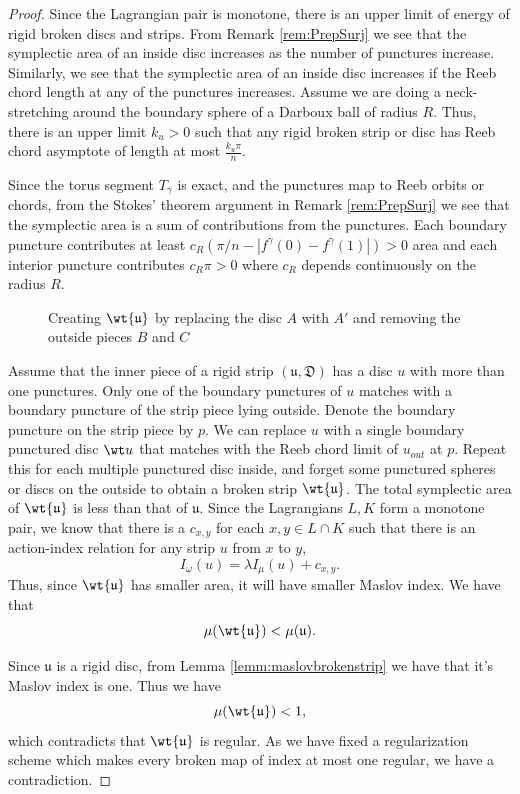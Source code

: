 \begin{proof}
Since the Lagrangian pair is monotone, there is an upper limit of energy of rigid broken discs and strips. From Remark \ref{rem:PrepSurj} we see that the symplectic area of an inside disc increases as the number of  punctures increase. Similarly, we see that the symplectic area of an inside disc increases if the Reeb chord length at any of the punctures increases. Assume we are doing a neck-stretching around the boundary sphere of a Darboux ball of radius $R$. Thus, there is an upper limit $k_u>0$ such that any rigid broken strip or disc has Reeb chord asymptote of length at most $\frac{k_u\pi}{n}$.

Since the torus segment $T_\gamma$ is exact, and the punctures map to Reeb orbits or chords, from the Stokes' theorem argument in Remark \ref{rem:PrepSurj} we see that the symplectic area is a sum of contributions from the punctures.  Each boundary puncture contributes at least $c_R(\pi/n - |f^{\gamma}(0)-f^{\gamma}(1)| ) > 0$ area and each interior puncture contributes $c_R\pi > 0$ where $c_R$ depends continuously on the radius $R$.

\begin{figure}[ht]
    \centering
    \caption{Creating $\wt{\mathfrak u}$ by replacing the disc $A$ with $A'$ and removing the outside pieces  $B$ and $C$ }
    \label{fig:smolbuild}
\end{figure}
Assume that the inner piece of a rigid strip $(\mathfrak {u,D})$ has a disc $u$ with more than one punctures. Only one of the boundary punctures of $u$ matches with a boundary puncture of the strip piece lying outside. Denote the boundary puncture on the strip piece by $p$.  We can replace $u$ with a single boundary punctured disc $\wt u$ that
matches with the Reeb chord limit of $u_{out}$ at $p$.  Repeat this for each multiple punctured disc inside, and forget some punctured spheres or discs on the outside to obtain a broken strip $\wt {\mathfrak u}$. The total symplectic area of $\wt  {\mathfrak u} $ is less than that of $\mathfrak u$. Since the Lagrangians $L,K$ form a monotone pair, we know that there is a $c_{x,y}$ for each $x,y\in L \cap K$ such that there is an action-index relation for any strip $u$ from $x$ to $y$,
$$I_\omega (u) = \lambda I_\mu (u) + c_{x,y}.$$
Thus, since $\wt {\mathfrak u}$ has smaller area, it will have smaller Maslov index. We have that $$\mu (\wt{\mathfrak u}) < \mu (\mathfrak{ u}).$$

Since $\mathfrak u$ is a rigid disc, from Lemma \ref{lemm:maslovbrokenstrip} we have that it's Maslov index is one. Thus we have $$\mu (\wt{\mathfrak u}) < 1,$$ which contradicts that $\wt{\mathfrak u}$
is regular. As we have fixed a regularization scheme which makes every broken map of index at most one regular, we have a contradiction.


\end{proof}
